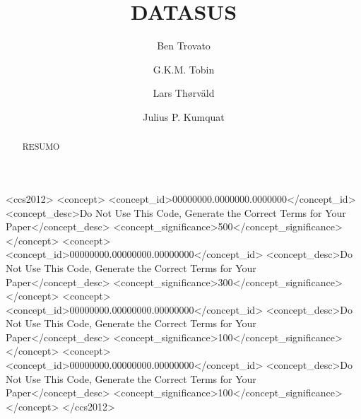 \documentclass[sigconf,natbib=false]{acmart}
\begin{document}
\title{DATASUS}
\renewcommand{\shorttitle}{Hope it is}

\author{Ben Trovato}
\author{G.K.M. Tobin}
\authornotemark[1]

\author{Lars Th{\o}rv{\"a}ld}


\author{Julius P. Kumquat}

\renewcommand{\shortauthors}{B. Trovato et al.}

\begin{abstract}
  RESUMO
\end{abstract}

\begin{CCSXML}
<ccs2012>
 <concept>
  <concept_id>00000000.0000000.0000000</concept_id>
  <concept_desc>Do Not Use This Code, Generate the Correct Terms for Your Paper</concept_desc>
  <concept_significance>500</concept_significance>
 </concept>
 <concept>
  <concept_id>00000000.00000000.00000000</concept_id>
  <concept_desc>Do Not Use This Code, Generate the Correct Terms for Your Paper</concept_desc>
  <concept_significance>300</concept_significance>
 </concept>
 <concept>
  <concept_id>00000000.00000000.00000000</concept_id>
  <concept_desc>Do Not Use This Code, Generate the Correct Terms for Your Paper</concept_desc>
  <concept_significance>100</concept_significance>
 </concept>
 <concept>
  <concept_id>00000000.00000000.00000000</concept_id>
  <concept_desc>Do Not Use This Code, Generate the Correct Terms for Your Paper</concept_desc>
  <concept_significance>100</concept_significance>
 </concept>
</ccs2012>
\end{CCSXML}
\end{document}
